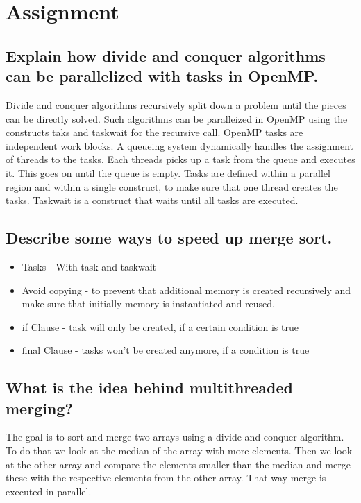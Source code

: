 \documentclass[runningheads]{llncs}
\begin{document}
\section{Assignment}

\subsection{Explain how divide and conquer algorithms can be parallelized with tasks in OpenMP.}
Divide and conquer algorithms recursively split down a problem until the pieces can be directly solved.
Such algorithms can be paralleized in OpenMP using the constructs taks and taskwait for the recursive call.
OpenMP tasks are independent work blocks. A queueing system dynamically handles the assignment of threads to the tasks. 
Each threads picks up a task from the queue and executes it. This goes on until the queue is empty. 
Tasks are defined within a parallel region and within a single construct, to make sure that one thread creates the tasks.
Taskwait is a construct that waits until all tasks are executed.

\subsection{Describe some ways to speed up merge sort.}
\begin{itemize}
	\item Tasks - With task and taskwait
	\item Avoid copying - to prevent that additional memory is created recursively and make sure that initially memory 
	is instantiated and reused.
	\item if Clause - task will only be created, if a certain condition is true
	\item final Clause - tasks won't be created anymore, if a condition is true
\end{itemize}


\subsection{What is the idea behind multithreaded merging?}
The goal is to sort and merge two arrays using a divide and conquer algorithm. To do that we look at the median of the
array with more elements. Then we look at the other array and compare the elements smaller than the median and merge these
with the respective elements from the other array. That way merge is executed in parallel.
\end{document}
